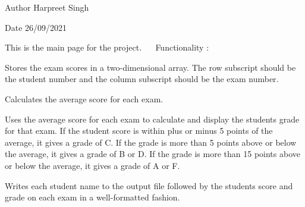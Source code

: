 \begin{DoxyAuthor}{Author}
Harpreet Singh 
\end{DoxyAuthor}
\begin{DoxyDate}{Date}
26/09/2021
\end{DoxyDate}
This is the main page for the project.~\newline
~\newline
Functionality \+: ~\newline

\begin{DoxyEnumerate}
\item Stores the exam scores in a two-\/dimensional array. The row subscript should be the student number and the column subscript should be the exam number.
\item Calculates the average score for each exam.
\item Uses the average score for each exam to calculate and display the students grade for that exam. If the student score is within plus or minus 5 points of the average, it gives a grade of C. If the grade is more than 5 points above or below the average, it gives a grade of B or D. If the grade is more than 15 points above or below the average, it gives a grade of A or F.
\item Writes each student name to the output file followed by the students score and grade on each exam in a well-\/formatted fashion. 
\end{DoxyEnumerate}
